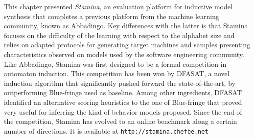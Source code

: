 This chapter presented \emph{Stamina}, an evaluation platform for inductive model synthesis that completes a previous platform from the machine learning community, known as Abbadingo. Key differences with the latter is that Stamina focuses on the difficulty of the learning with respect to the alphabet size and relies on adapted protocols for generating target machines and samples presenting characteristics observed on models used by the software engineering community. Like Abbadingo, Stamina was first designed to be a formal competition in automaton induction. This competition has been won by DFASAT, a novel induction algorithm that significantly pushed forward the state-of-the-art, by outperforming Blue-fringe used as baseline. Among other ingredients, DFASAT identified an alternative scoring heuristics to the one of Blue-fringe that proved very useful for inferring the kind of behavior models proposed. Since the end of the competition, Stamina has evolved to an online benchmark along a certain number of directions. It is available at \verb|http://stamina.chefbe.net|
